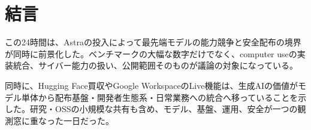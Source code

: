 \section{結言}

この24時間は、Astraの投入によって最先端モデルの能力競争と安全配布の境界が同時に前景化した。ベンチマークの大幅な数字だけでなく、computer useの実装統合、サイバー能力の扱い、公開範囲そのものが議論の対象になっている。

同時に、Hugging Face買収やGoogle WorkspaceのLive機能は、生成AIの価値がモデル単体から配布基盤・開発者生態系・日常業務への統合へ移っていることを示した。研究・OSSの小規模な共有も含め、モデル、基盤、運用、安全が一つの観測窓に重なった一日だった。

